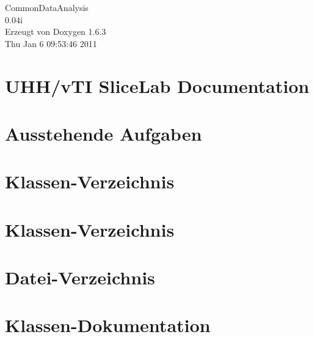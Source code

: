 \documentclass[a4paper]{book}
\begin{document}
\hypersetup{pageanchor=false}
\begin{titlepage}
\vspace*{7cm}
\begin{center}
{\Large CommonDataAnalysis \\[1ex]\large 0.04i }\\
\vspace*{1cm}
{\large Erzeugt von Doxygen 1.6.3}\\
\vspace*{0.5cm}
{\small Thu Jan 6 09:53:46 2011}\\
\end{center}
\end{titlepage}
\clearemptydoublepage
{}
\tableofcontents
\clearemptydoublepage
{}
\hypersetup{pageanchor=true}
\chapter{UHH/vTI SliceLab Documentation}
\label{index}\hypertarget{index}{}
\chapter{Ausstehende Aufgaben}
\label{todo}
\hypertarget{todo}{}

\chapter{Klassen-\/Verzeichnis}

\chapter{Klassen-\/Verzeichnis}

\chapter{Datei-\/Verzeichnis}

\chapter{Klassen-\/Dokumentation}














\end{document}
